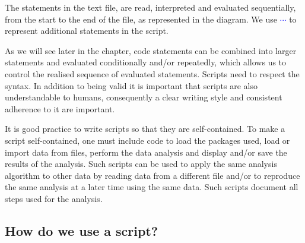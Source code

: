 The statements in the text file, are read, interpreted and evaluated sequentially, from the start to the end of the file, as represented in the diagram. We use \textcolor{blue}{$\cdots$} to represent additional statements in the script.

\begin{center}
\begin{small}
\end{small}
\end{center}

As we will see later in the chapter, code statements can be combined into larger statements and evaluated conditionally and/or repeatedly, which allows us to control the realised sequence of evaluated statements. Scripts need to respect the \Rlang syntax. In addition to being valid it is important that scripts are also understandable to humans, consequently a clear writing style and consistent adherence to it are important.

It is good practice to write scripts so that they are self-contained. To make a script self-contained, one must include code to load the packages used, load or import data from files, perform the data analysis and display and/or save the results of the analysis. Such scripts can be used to apply the same analysis algorithm to other data by reading data from a different file and/or to reproduce the same analysis at a later time using the same data. Such scripts document all steps used for the analysis.



\subsection{How do we use a script?}\label{sec:script:using}

